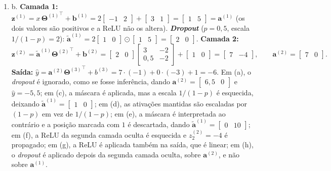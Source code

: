\documentclass{dlproblemset}
\begin{document}
\begin{enumerate}[1)]
    \item b. \textbf{Camada 1:} $\mathbf{z}^{(1)} = x\,{\mathbf{\Theta}^{(1)}}^{\top} + \mathbf{b}^{(1)} = 2\begin{bmatrix} -1 & 2 \end{bmatrix} + \begin{bmatrix} 3 & 1 \end{bmatrix} = \begin{bmatrix} 1 & 5 \end{bmatrix} = \mathbf{a}^{(1)}$ (os dois valores são positivos e a ReLU não os altera). \textbf{\textit{Dropout}} ($p = 0{,}5$, escala $1/(1-p) = 2$): $\widetilde{\mathbf{a}}^{(1)} = 2\begin{bmatrix} 1 & 0 \end{bmatrix} \odot \begin{bmatrix} 1 & 5 \end{bmatrix} = \begin{bmatrix} 2 & 0 \end{bmatrix}$. \textbf{Camada 2:}
    \[
    \mathbf{z}^{(2)} = \widetilde{\mathbf{a}}^{(1)}{\mathbf{\Theta}^{(2)}}^{\top} + \mathbf{b}^{(2)}
    = \begin{bmatrix} 2 & 0 \end{bmatrix}\begin{bmatrix} 3 & -2 \\ 0{,}5 & -2 \end{bmatrix} + \begin{bmatrix} 1 & 0 \end{bmatrix}
    = \begin{bmatrix} 7 & -4 \end{bmatrix},
    \qquad
    \mathbf{a}^{(2)} = \begin{bmatrix} 7 & 0 \end{bmatrix}.
    \]
    \textbf{Saída:} $\hat{y} = \mathbf{a}^{(2)}{\mathbf{\Theta}^{(3)}}^{\top} + b^{(3)} = 7\cdot(-1) + 0\cdot(-3) + 1 = -6$. Em (a), o \textit{dropout} é ignorado, como se fosse inferência, dando $\mathbf{a}^{(2)} = \begin{bmatrix} 6{,}5 & 0 \end{bmatrix}$ e $\hat{y} = -5{,}5$; em (c), a máscara é aplicada, mas a escala $1/(1-p)$ é esquecida, deixando $\widetilde{\mathbf{a}}^{(1)} = \begin{bmatrix} 1 & 0 \end{bmatrix}$; em (d), as ativações mantidas são escaladas por $(1-p)$ em vez de $1/(1-p)$; em (e), a máscara é interpretada ao contrário e a posição marcada com $1$ é descartada, dando $\widetilde{\mathbf{a}}^{(1)} = \begin{bmatrix} 0 & 10 \end{bmatrix}$; em (f), a ReLU da segunda camada oculta é esquecida e $z^{(2)}_2 = -4$ é propagado; em (g), a ReLU é aplicada também na saída, que é linear; em (h), o \textit{dropout} é aplicado depois da segunda camada oculta, sobre $\mathbf{a}^{(2)}$, e não sobre $\mathbf{a}^{(1)}$.
\end{enumerate}
\end{document}
